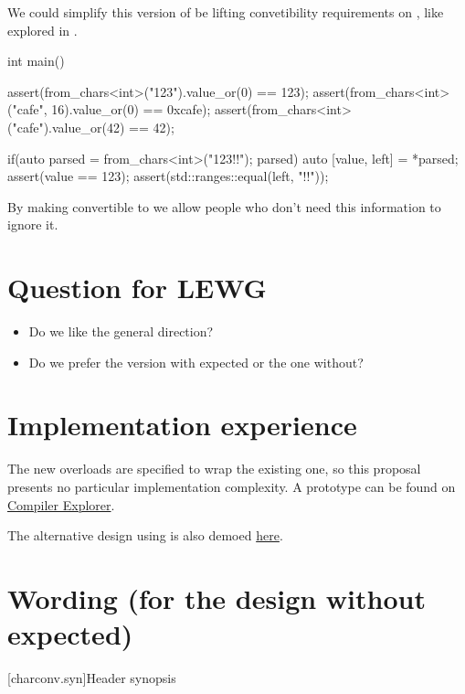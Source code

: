 \documentclass{wg21}
\begin{document}
We could simplify this version of  be lifting convetibility requirements on
, like explored in .

\begin{colorblock}
int main() {
    assert(from_chars<int>("123").value_or(0) == 123);
    assert(from_chars<int>("cafe", 16).value_or(0) == 0xcafe);
    assert(from_chars<int>("cafe").value_or(42) == 42);

    if(auto parsed = from_chars<int>("123!!"); parsed) {
        auto [value, left] = *parsed;
        assert(value == 123);
        assert(std::ranges::equal(left, "!!"));
    }
}
\end{colorblock}

By making  convertible to  we allow people who don't need this information to ignore it.



\section{Question for LEWG}

\begin{itemize}
    \item Do we like the general direction?
    \item Do we prefer the version with expected or the one without?
\end{itemize}

\section{Implementation experience}

The new overloads are specified to wrap the existing one, so this proposal presents
no particular implementation complexity. A prototype can be found on \href{https://godbolt.org/z/rnxE1o9Ma}{Compiler Explorer}.

The alternative design using  is also demoed \href{https://godbolt.org/z/c5McG9TTd}{here}.

\section{Wording (for the design without expected)}

[charconv.syn]{Header  synopsis}
\end{document}
